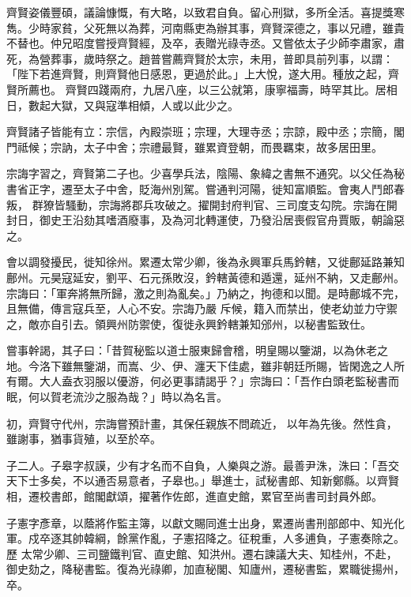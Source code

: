 \begin{pinyinscope}
 齊賢姿儀豐碩，議論慷慨，有大略，以致君自負。留心刑獄，多所全活。喜提獎寒雋。少時家貧，父死無以為葬，河南縣吏為辦其事，齊賢深德之，事以兄禮，雖貴不替也。仲兄昭度嘗授齊賢經，及卒，表贈光祿寺丞。又嘗依太子少師李肅家，肅死，為營葬事，歲時祭之。趙普嘗薦齊賢於太宗，未用，普即具前列事，以謂：「陛下若進齊賢，則齊賢他日感恩，更過於此。」上大悅，遂大用。種放之起，齊賢所薦也。
 齊賢四踐兩府，九居八座，以三公就第，康寧福壽，時罕其比。居相日，數起大獄，又與寇準相傾，人或以此少之。



 齊賢諸子皆能有立：宗信，內殿崇班；宗理，大理寺丞；宗諒，殿中丞；宗簡，閣門祗候；宗訥，太子中舍；宗禮最賢，雖累資登朝，而畏羈束，故多居田里。



 宗誨字習之，齊賢第二子也。少喜學兵法，陰陽、象緯之書無不通究。以父任為秘書省正字，遷至太子中舍，貶海州別駕。嘗通判河陽，徙知富順監。會夷人鬥郎春叛，
 群獠皆騷動，宗誨將郡兵攻破之。擢開封府判官、三司度支勾院。宗誨在開封日，御史王沿劾其嗜酒廢事，及為河北轉運使，乃發沿居喪假官舟賈販，朝論惡之。



 會以調發擾民，徙知徐州。累遷太常少卿，後為永興軍兵馬鈐轄，又徙鄜延路兼知鄜州。元昊寇延安，劉平、石元孫敗沒，鈐轄黃德和遁還，延州不納，又走鄜州。宗誨曰：「軍奔將無所歸，激之則為亂矣。」乃納之，拘德和以聞。是時鄜城不完，且無備，傳言寇兵至，人心不安。宗誨乃嚴
 斥候，籍入而禁出，使老幼並力守禦之，敵亦自引去。領興州防禦使，復徙永興鈐轄兼知邠州，以秘書監致仕。



 嘗事幹謁，其子曰：「昔賀秘監以道士服東歸會稽，明皇賜以鑒湖，以為休老之地。今洛下雖無鑒湖，而嵩、少、伊、瀍天下佳處，雖非朝廷所賜，皆閑逸之人所有爾。大人盍衣羽服以優游，何必更事請謁乎？」宗誨曰：「吾作白頭老監秘書而眠，何以賀老流沙之服為哉？」時以為名言。



 初，齊賢守代州，宗誨嘗預計畫，其保任親族不問疏近，
 以年為先後。然性貪，雖謝事，猶事貨殖，以至於卒。



 子二人。子皋字叔謨，少有才名而不自負，人樂與之游。最善尹洙，洙曰：「吾交天下士多矣，不以通否易意者，子皋也。」舉進士，試秘書郎、知新鄭縣。以齊賢相，遷校書郎，館閣獻頌，擢著作佐郎，進直史館，累官至尚書司封員外郎。



 子憲字彥章，以蔭將作監主簿，以獻文賜同進士出身，累遷尚書刑部郎中、知光化軍。戍卒逐其帥韓綱，餘黨作亂，子憲招降之。征稅重，人多逋負，子憲奏除之。歷
 太常少卿、三司鹽鐵判官、直史館、知洪州。遷右諫議大夫、知桂州，不赴，御史劾之，降秘書監。復為光祿卿，加直秘閣、知廬州，遷秘書監，累職徙揚州，卒。




\end{pinyinscope}
